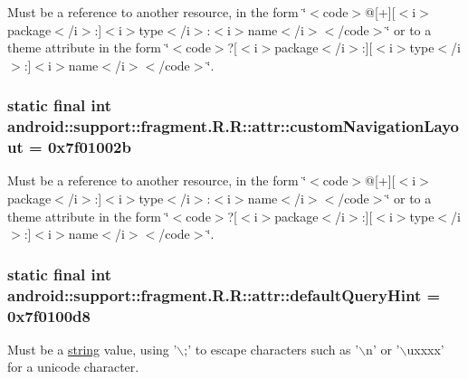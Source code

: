 Must be a reference to another resource, in the form \char`\"{}$<$code$>$@\mbox{[}+\mbox{]}\mbox{[}$<$i$>$package$<$/i$>$:\mbox{]}$<$i$>$type$<$/i$>$:$<$i$>$name$<$/i$>$$<$/code$>$\char`\"{} or to a theme attribute in the form \char`\"{}$<$code$>$?\mbox{[}$<$i$>$package$<$/i$>$:\mbox{]}\mbox{[}$<$i$>$type$<$/i$>$:\mbox{]}$<$i$>$name$<$/i$>$$<$/code$>$\char`\"{}. \hypertarget{classandroid_1_1support_1_1fragment_1_1_r_1_1attr_ab791277ce361b51923bcfa4f31b5527}{
\subsubsection[{customNavigationLayout}]{\setlength{\rightskip}{0pt plus 5cm}static final int android::support::fragment.R.R::attr::customNavigationLayout = 0x7f01002b}}
\label{classandroid_1_1support_1_1fragment_1_1_r_1_1attr_ab791277ce361b51923bcfa4f31b5527}


Must be a reference to another resource, in the form \char`\"{}$<$code$>$@\mbox{[}+\mbox{]}\mbox{[}$<$i$>$package$<$/i$>$:\mbox{]}$<$i$>$type$<$/i$>$:$<$i$>$name$<$/i$>$$<$/code$>$\char`\"{} or to a theme attribute in the form \char`\"{}$<$code$>$?\mbox{[}$<$i$>$package$<$/i$>$:\mbox{]}\mbox{[}$<$i$>$type$<$/i$>$:\mbox{]}$<$i$>$name$<$/i$>$$<$/code$>$\char`\"{}. \hypertarget{classandroid_1_1support_1_1fragment_1_1_r_1_1attr_6c1f3742ffdea3679e64edad805a97f2}{
\subsubsection[{defaultQueryHint}]{\setlength{\rightskip}{0pt plus 5cm}static final int android::support::fragment.R.R::attr::defaultQueryHint = 0x7f0100d8}}
\label{classandroid_1_1support_1_1fragment_1_1_r_1_1attr_6c1f3742ffdea3679e64edad805a97f2}


Must be a \hyperlink{classandroid_1_1support_1_1fragment_1_1_r_1_1string}{string} value, using '$\backslash$;' to escape characters such as '$\backslash$n' or '$\backslash$uxxxx' for a unicode character. 

